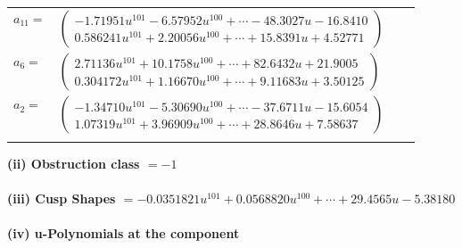 \documentclass[1p]{elsarticle_modified}
\theoremstyle{definition}
\begin{document}
\begin{tabular}{m{7pt} m{180pt} m{7pt} m{180pt} }
\flushright $a_{11}=$&$\begin{pmatrix}-1.71951 u^{101}-6.57952 u^{100}+\cdots-48.3027 u-16.8410\\0.586241 u^{101}+2.20056 u^{100}+\cdots+15.8391 u+4.52771\end{pmatrix}$ \\
\flushright $a_{6}=$&$\begin{pmatrix}2.71136 u^{101}+10.1758 u^{100}+\cdots+82.6432 u+21.9005\\0.304172 u^{101}+1.16670 u^{100}+\cdots+9.11683 u+3.50125\end{pmatrix}$ \\
\flushright $a_{2}=$&$\begin{pmatrix}-1.34710 u^{101}-5.30690 u^{100}+\cdots-37.6711 u-15.6054\\1.07319 u^{101}+3.96909 u^{100}+\cdots+28.8646 u+7.58637\end{pmatrix}$\\&\end{tabular}
\flushleft \textbf{(ii) Obstruction class $= -1$}\\~\\
\flushleft \textbf{(iii) Cusp Shapes $= -0.0351821 u^{101}+0.0568820 u^{100}+\cdots+29.4565 u-5.38180$}\\~\\
\newpage\renewcommand{\arraystretch}{1}
\flushleft \textbf{(iv) u-Polynomials at the component}\newline \\
\end{document}
